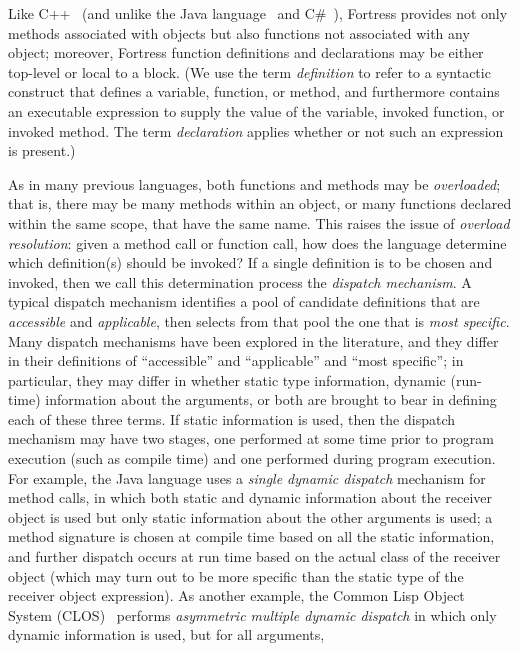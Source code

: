 Like C++~\cite{C-PLUS-PLUS} (and unlike the Java language~\cite{JLS1}
and C\#~\cite{CSHARP-ECMA-334-2001}), Fortress provides not
only methods associated with objects but also functions not associated with
any object; moreover, Fortress function definitions and declarations may be either
top-level or local to a block.  (We use the term
\emph{definition} to refer to a syntactic construct that defines a variable, function,
or method, and furthermore contains an executable expression to supply
the value of the variable, invoked function, or invoked method.
The term \emph{declaration} applies whether or not such an expression is present.)

As in many previous languages, both functions and methods may be
\emph{overloaded}; that is, there may be many methods within an
object, or many functions declared within the same scope, that have
the same name.  This raises the issue of \emph{overload resolution}:
given a method call or function call, how does the language determine
which definition(s) should be invoked?  If a single
definition is to be chosen and invoked, then we call this determination
process the \emph{dispatch mechanism}.  A typical dispatch mechanism
identifies a pool of candidate definitions that are \emph{accessible}
and \emph{applicable}, then selects from that pool the one that is
\emph{most specific}.  Many dispatch mechanisms have
been explored in the literature, and they differ in their definitions
of ``accessible'' and ``applicable'' and ``most specific'';
in particular, they may differ in whether static type information,
dynamic (run-time) information about the arguments, or both are
brought to bear in defining each of these three terms.
If static information is used, then the dispatch mechanism may
have two stages, one performed at some time prior to program
execution (such as compile time) and one performed during program
execution.
For example, the Java language uses a \emph{single dynamic dispatch} mechanism
for method calls,
in which both static and dynamic information about the receiver
object is used but only static information about the other arguments
is used; a method signature is chosen at compile time based on all
the static information, and further dispatch occurs at run time
based on the actual class of the receiver object (which may turn out to be
more specific than the static type of the receiver object expression).
As another example, the Common Lisp Object System (CLOS)~\cite{ECOOP87-CLOS,CLOS-SPECIFICATION,CLTL2,CACM-CLOS}
performs \emph{asymmetric multiple dynamic dispatch}
in which only dynamic information is used, but for all arguments,
